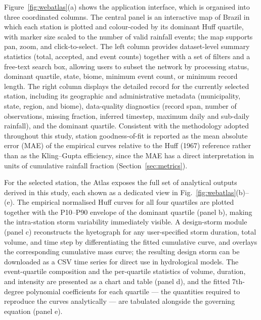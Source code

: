 \documentclass[a4paper,fleqn]{cas-sc}
\begin{document}
Figure~\ref{fig:webatlas}(a) shows the application interface, which is
organised into three coordinated columns. The central panel is an
interactive map of Brazil in which each station is plotted and
colour-coded by its dominant Huff quartile, with marker size scaled
to the number of valid rainfall events; the map supports pan, zoom,
and click-to-select. The left column provides dataset-level summary
statistics (total, accepted, and event counts) together with a set of
filters and a free-text search box, allowing users to subset the
network by processing status, dominant quartile, state, biome, minimum
event count, or minimum record length. The right column displays the
detailed record for the currently selected station, including its
geographic and administrative metadata (municipality, state, region,
and biome), data-quality diagnostics (record span, number of
observations, missing fraction, inferred timestep, maximum daily and
sub-daily rainfall), and the dominant quartile. Consistent with the
methodology adopted throughout this study, station goodness-of-fit is
reported as the mean absolute error (MAE) of the empirical curves
relative to the Huff (1967) reference rather than as the
Kling–Gupta efficiency, since the MAE has a direct interpretation in
units of cumulative rainfall fraction (Section~\ref{sec:metrics}).

For the selected station, the Atlas exposes the full set of analytical
outputs derived in this study, each shown as a dedicated view in
Fig.~\ref{fig:webatlas}(b)–(e). The empirical normalised Huff curves
for all four quartiles are plotted together with the P10–P90 envelope
of the dominant quartile (panel b), making the intra-station storm
variability immediately visible. A design-storm module (panel c)
reconstructs the hyetograph for any user-specified storm duration,
total volume, and time step by differentiating the fitted cumulative
curve, and overlays the corresponding cumulative mass curve; the
resulting design storm can be downloaded as a CSV time series for
direct use in hydrological models. The event-quartile composition and
the per-quartile statistics of volume, duration, and intensity are
presented as a chart and table (panel d), and the fitted 7th-degree
polynomial coefficients for each quartile — the quantities required to
reproduce the curves analytically — are tabulated alongside the
governing equation (panel e).
\end{document}
